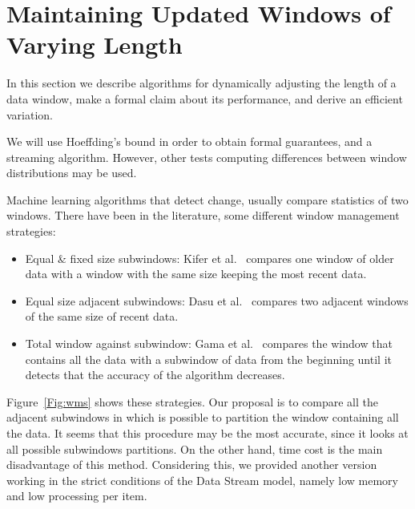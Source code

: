 %

\section{Maintaining Updated Windows of Varying Length}
\label{SMain}
In %
this section we describe algorithms 
for dynamically adjusting the length
of a data window, make a formal claim about its performance, and 
derive an efficient variation.

We will use Hoeffding's bound in order to obtain formal guarantees, and %
a streaming algorithm.
However, other tests computing differences between window distributions may be used.
 

\BEGINOMIT
Machine learning algorithms that detect change, usually compare statistics of two windows.
There have been in the literature, some different window management strategies:
\begin{itemize}
\item Equal \& fixed size subwindows: Kifer et al.~\cite{kifer-detecting} compares one window of older data with a window with the same size keeping the most recent data.
\item Equal size adjacent subwindows: Dasu et al.~\cite{Dasu} compares two adjacent windows of the same size of recent data.
\item Total window against subwindow: Gama et al.~\cite{Gama} compares the window that contains all the data with a subwindow of data from the beginning until it detects that the accuracy of the algorithm decreases.
\end{itemize}

Figure~\ref{Fig:wms} shows these strategies.
Our proposal is to compare all the adjacent subwindows in which is possible to partition the window containing all the data.
It seems that this procedure may be the most accurate, since it looks at all possible subwindows partitions. On the other hand, time cost is the main disadvantage of this method. Considering this, we provided another version working in the strict conditions of the Data Stream model, namely low
memory and low processing per item.


